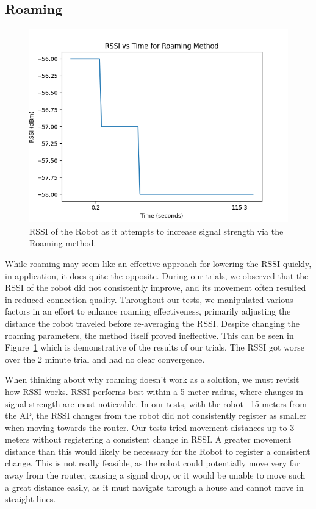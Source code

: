 \subsection{Roaming}

\begin{figure}[tp]
\centering
\includegraphics[scale=0.5]{figures/rssi_roaming}
\caption{RSSI of the Robot as it attempts to increase signal strength via the Roaming method. }
\label{fig:rssi_roaming}
\end{figure}

While roaming may seem like an effective approach for lowering the RSSI quickly, in application, it does quite the opposite. During our trials, we observed that the RSSI of the robot did not consistently improve, and its movement often resulted in reduced connection quality. Throughout our tests, we manipulated various factors in an effort to enhance roaming effectiveness, primarily adjusting the distance the robot traveled before re-averaging the RSSI. Despite changing the roaming parameters, the method itself proved ineffective. This can be seen in Figure~\ref{fig:rssi_roaming} which is demonstrative of the results of our trials. The RSSI got worse over the 2 minute trial and had no clear convergence. 

When thinking about why roaming doesn’t work as a solution, we must revisit how RSSI works. RSSI performs best within a 5 meter radius, where changes in signal strength are most noticeable. In our tests, with the robot ~15 meters from the AP, the RSSI changes from the robot did not consistently register as smaller when moving towards the router. Our tests tried movement distances up to 3 meters without registering a consistent change in RSSI. A greater movement distance than this would likely be necessary for the Robot to register a consistent change. This is not really feasible, as the robot could potentially move very far away from the router, causing a signal drop, or it would be unable to move such a great distance easily, as it must navigate through a house and cannot move in straight lines.
